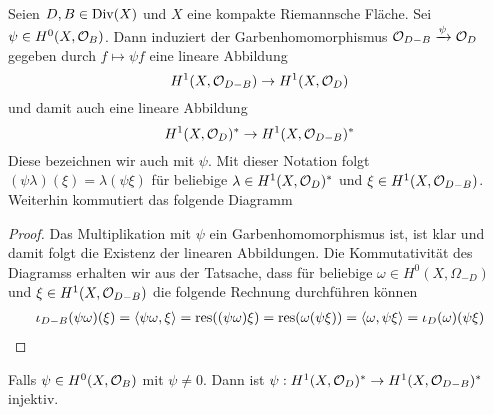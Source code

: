 \begin{lemma}
  Seien $D, B \in \operatorname{Div}(X)$ und $X$ eine kompakte Riemannsche
  Fläche. Sei $\psi \in H^0(X, \mathcal{O}_B)$. Dann induziert der
  Garbenhomomorphismus $\mathcal{O}_{D-B} \xrightarrow{\psi} \mathcal{O}_D$ gegeben
  durch $f \mapsto \psi f$ eine lineare Abbildung
  \[
  H^1(X, \mathcal{O}_{D-B}) \rightarrow H^1(X, \mathcal{O}_D)
  \]
  und damit auch eine lineare Abbildung
  \[
  H^1(X, \mathcal{O}_D)^\ast \rightarrow H^1(X, \mathcal{O}_{D-B})^\ast
  \]
  Diese bezeichnen wir auch mit $\psi$. Mit dieser Notation folgt
  $(\psi \lambda)(\xi) = \lambda(\psi \xi)$ für beliebige $\lambda \in
  H^1(X, \mathcal{O}_D)^\ast$ und $\xi \in H^1(X, \mathcal{O}_{D-B})$. Weiterhin
  kommutiert das folgende Diagramm
  \begin{center}
  \end{center}
\end{lemma}

\begin{proof}
  Das Multiplikation mit $\psi$ ein Garbenhomomorphismus ist, ist klar
  und damit folgt die Existenz der linearen Abbildungen. Die
  Kommutativität des Diagramss erhalten wir aus der Tatsache, dass für
  beliebige $\omega \in H^0(X, \Omega_{-D})$ und $\xi \in H^1(X,
  \mathcal{O}_{D-B})$ die folgende Rechnung durchführen können
  \begin{align*}
    \iota_{D-B}(\psi \omega)(\xi) = \langle \psi \omega, \xi \rangle = \operatorname{res}((\psi
    \omega) \xi) = \operatorname{res}(\omega (\psi \xi)) = \langle \omega, \psi \xi \rangle =
    \iota_D(\omega)(\psi \xi)
  \end{align*}
\end{proof}

\begin{lemma}
  \label{lemma:psi-inj}
  Falls $\psi \in H^0(X, \mathcal{O}_B)$ mit $\psi \neq 0$. Dann ist $\psi:
  H^1(X, \mathcal{O}_D)^\ast \rightarrow H^1(X, \mathcal{O}_{D-B})^\ast$ injektiv.
\end{lemma}

